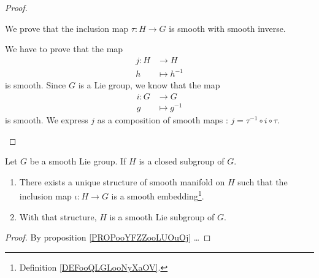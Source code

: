 \begin{proof}
\begin{subproof}
\begin{subproof}
			\spitem[Inclusion]
			We prove that the inclusion map \(\tau \colon H\to G  \) is smooth with smooth inverse.

			\spitem[Inverse]
			We have to prove that the map
			\begin{equation}
				\begin{aligned}
					j\colon H & \to H          \\
					h         & \mapsto h^{-1}
				\end{aligned}
			\end{equation}
			is smooth. Since \( G\) is a Lie group, we know that the map
			\begin{equation}
				\begin{aligned}
					i\colon G & \to G          \\
					g         & \mapsto g^{-1}
				\end{aligned}
			\end{equation}
			is smooth. We express \( j\) as a composition of smooth maps : \( j=\tau^{-1}\circ i\circ\tau\).

		\end{subproof}
	\end{subproof}
\end{proof}



\begin{theorem}     \label{THOooDEJHooVKJYBL}
	Let \( G\) be a smooth Lie group. If \( H\) is a closed subgroup of \( G\).

	\begin{enumerate}
		\item
		      There exists a unique structure of smooth manifold on \( H\) such that the inclusion map \( \iota\colon H\to G\) is a smooth embedding\footnote{Definition \ref{DEFooQLGLooNyXaOV}.}.
		\item
		      With that structure, \( H\) is a smooth Lie subgroup of \( G\).
	\end{enumerate}
\end{theorem}

\begin{proof}
	By proposition \ref{PROPooYFZZooLUOuOj}  \ldots
\end{proof}


